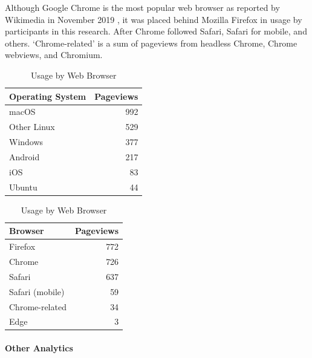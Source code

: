 \documentclass{article}
\begin{document}
Although Google Chrome is the most popular web browser as reported by Wikimedia in November 2019 \cite{noauthor_dashiki:_nodate}, it was placed behind Mozilla Firefox in usage by participants in this research. After Chrome followed Safari, Safari for mobile, and others. `Chrome-related' is a sum of pageviews from headless Chrome, Chrome webviews, and Chromium.

\begin{table}[!htb]
	\begin{minipage}{.5\linewidth}
		\caption{Usage by Operating System}
		\centering
		\begin{tabular}{lr}
			\hline
			\textbf{Operating System} & \textbf{Pageviews} \\
			\hline
			macOS                     & 992                \\
			Other Linux               & 529                \\
			Windows                   & 377                \\
			Android                   & 217                \\
			iOS                       & 83                 \\
			Ubuntu                    & 44                 \\
			\hline
		\end{tabular}
	\end{minipage}%
	\hspace{.1cm}
	\begin{minipage}{.5\linewidth}
		\centering
		\caption{Usage by Web Browser}
		\begin{tabular}{lr}
			\hline
			\textbf{Browser} & \textbf{Pageviews} \\
			\hline
			Firefox          & 772                \\
			Chrome           & 726                \\
			Safari           & 637                \\
			Safari (mobile)  & 59                 \\
			Chrome-related   & 34                 \\
			Edge             & 3                  \\
			\hline
		\end{tabular}
	\end{minipage} 
\end{table}

\paragraph{Other Analytics}
\end{document}
